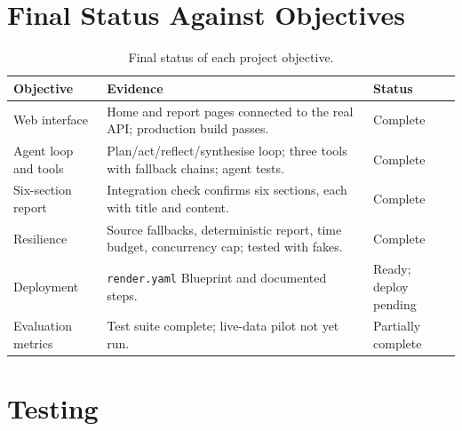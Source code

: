 \documentclass[12pt,a4paper,oneside]{report}
\begin{document}
\section{Final Status Against Objectives}
\begin{table}[H]\centering\small
\begin{tabularx}{\textwidth}{>{\raggedright\arraybackslash}p{3.4cm}X>{\raggedright\arraybackslash}p{2.7cm}}
\toprule \textbf{Objective} & \textbf{Evidence} & \textbf{Status}\\\midrule
Web interface & Home and report pages connected to the real API; production build passes. & Complete\\
Agent loop and tools & Plan/act/reflect/synthesise loop; three tools with fallback chains; agent tests. & Complete\\
Six-section report & Integration check confirms six sections, each with title and content. & Complete\\
Resilience & Source fallbacks, deterministic report, time budget, concurrency cap; tested with fakes. & Complete\\
Deployment & \texttt{render.yaml} Blueprint and documented steps. & Ready; deploy pending\\
Evaluation metrics & Test suite complete; live-data pilot not yet run. & Partially complete\\
\bottomrule
\end{tabularx}
\caption{Final status of each project objective.}
\label{tab:objectives}
\end{table}

\section{Testing}
\end{document}
